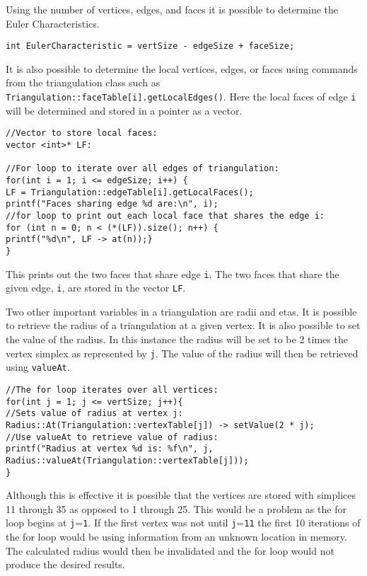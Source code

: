 \documentclass{amsart}
\theoremstyle{plain}
\numberwithin{equation}{section}
\begin{document}
\noindent Using the number of vertices, edges, and faces it is possible to determine the Euler Characteristics.\newline

\begin{verbatim}
int EulerCharacteristic = vertSize - edgeSize + faceSize;

\end{verbatim} 

\noindent It is also possible to determine the local vertices, edges, or faces using commands from the triangulation class such as \verb=Triangulation::faceTable[i].getLocalEdges()=. Here the local faces of edge \verb=i= will be determined and stored in a pointer as a vector. \newline

\begin{verbatim}
//Vector to store local faces:
vector <int>* LF:

//For loop to iterate over all edges of triangulation:
for(int i = 1; i <= edgeSize; i++) {
LF = Triangulation::edgeTable[i].getLocalFaces();
printf("Faces sharing edge %d are:\n", i);
//for loop to print out each local face that shares the edge i:
for (int n = 0; n < (*(LF)).size(); n++) {
printf("%d\n", LF -> at(n));}
}

\end{verbatim} 

\noindent This prints out the two faces that share edge \verb=i=. The two faces that share the given edge, \verb=i=, are stored in the vector \verb=LF=. \newline

Two other important variables in a triangulation are radii and etas.  It is possible to retrieve the radius of a triangulation at a given vertex.  It is also possible to set the value of the radius.  In this instance the radius will be set to be 2 times the vertex simplex as represented by \verb=j=. The value of the radius will then be retrieved using \verb=valueAt=. \newline

\begin{verbatim}
//The for loop iterates over all vertices:
for(int j = 1; j <= vertSize; j++){
//Sets value of radius at vertex j:
Radius::At(Triangulation::vertexTable[j]) -> setValue(2 * j);
//Use valueAt to retrieve value of radius:
printf("Radius at vertex %d is: %f\n", j, Radius::valueAt(Triangulation::vertexTable[j]));
}

\end{verbatim} 
\noindent Although this is effective it is possible that the vertices are stored with simplices 11 through 35 as opposed to 1 through 25.  This would be a problem as the for loop begins at \verb=j==\verb=1=. If the first vertex was not until \verb=j==\verb=11= the first 10 iterations of the for loop would be using information from an unknown location in memory.  The calculated radius would then be invalidated and the for loop would not produce the desired results. \newline
\end{document}
